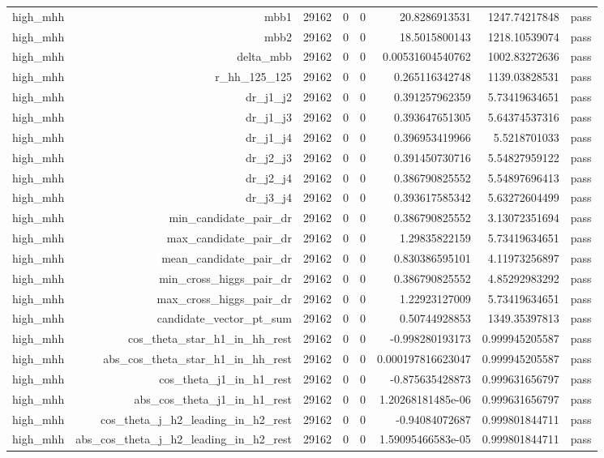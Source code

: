 \begin{table}[htbp]
{\begin{tabular}{lrrrrrrr}
high\_mhh & mbb1 & 29162 & 0 & 0 & 20.8286913531 & 1247.74217848 & pass \\
high\_mhh & mbb2 & 29162 & 0 & 0 & 18.5015800143 & 1218.10539074 & pass \\
high\_mhh & delta\_mbb & 29162 & 0 & 0 & 0.00531604540762 & 1002.83272636 & pass \\
high\_mhh & r\_hh\_125\_125 & 29162 & 0 & 0 & 0.265116342748 & 1139.03828531 & pass \\
high\_mhh & dr\_j1\_j2 & 29162 & 0 & 0 & 0.391257962359 & 5.73419634651 & pass \\
high\_mhh & dr\_j1\_j3 & 29162 & 0 & 0 & 0.393647651305 & 5.64374537316 & pass \\
high\_mhh & dr\_j1\_j4 & 29162 & 0 & 0 & 0.396953419966 & 5.5218701033 & pass \\
high\_mhh & dr\_j2\_j3 & 29162 & 0 & 0 & 0.391450730716 & 5.54827959122 & pass \\
high\_mhh & dr\_j2\_j4 & 29162 & 0 & 0 & 0.386790825552 & 5.54897696413 & pass \\
high\_mhh & dr\_j3\_j4 & 29162 & 0 & 0 & 0.393617585342 & 5.63272604499 & pass \\
high\_mhh & min\_candidate\_pair\_dr & 29162 & 0 & 0 & 0.386790825552 & 3.13072351694 & pass \\
high\_mhh & max\_candidate\_pair\_dr & 29162 & 0 & 0 & 1.29835822159 & 5.73419634651 & pass \\
high\_mhh & mean\_candidate\_pair\_dr & 29162 & 0 & 0 & 0.830386595101 & 4.11973256897 & pass \\
high\_mhh & min\_cross\_higgs\_pair\_dr & 29162 & 0 & 0 & 0.386790825552 & 4.85292983292 & pass \\
high\_mhh & max\_cross\_higgs\_pair\_dr & 29162 & 0 & 0 & 1.22923127009 & 5.73419634651 & pass \\
high\_mhh & candidate\_vector\_pt\_sum & 29162 & 0 & 0 & 0.50744928853 & 1349.35397813 & pass \\
high\_mhh & cos\_theta\_star\_h1\_in\_hh\_rest & 29162 & 0 & 0 & -0.998280193173 & 0.999945205587 & pass \\
high\_mhh & abs\_cos\_theta\_star\_h1\_in\_hh\_rest & 29162 & 0 & 0 & 0.000197816623047 & 0.999945205587 & pass \\
high\_mhh & cos\_theta\_j1\_in\_h1\_rest & 29162 & 0 & 0 & -0.875635428873 & 0.999631656797 & pass \\
high\_mhh & abs\_cos\_theta\_j1\_in\_h1\_rest & 29162 & 0 & 0 & 1.20268181485e-06 & 0.999631656797 & pass \\
high\_mhh & cos\_theta\_j\_h2\_leading\_in\_h2\_rest & 29162 & 0 & 0 & -0.94084072687 & 0.999801844711 & pass \\
high\_mhh & abs\_cos\_theta\_j\_h2\_leading\_in\_h2\_rest & 29162 & 0 & 0 & 1.59095466583e-05 & 0.999801844711 & pass \\
\bottomrule
\end{tabular}
}
\end{table}
